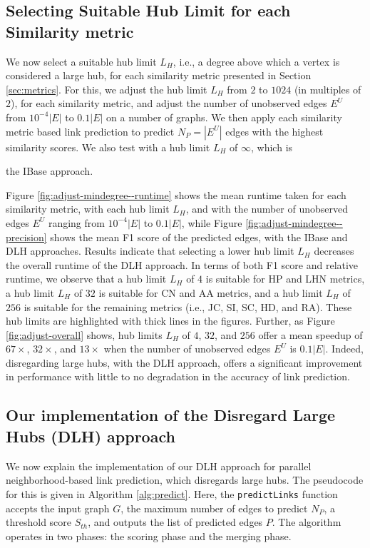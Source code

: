 \subsection{Selecting Suitable Hub Limit for each Similarity metric}
\label{sec:select-limit}

We now select a suitable hub limit $L_H$, i.e., a degree above which a vertex is considered a large hub, for each similarity metric presented in Section \ref{sec:metrics}. For this, we adjust the hub limit $L_H$ from $2$ to $1024$ (in multiples of $2$), for each similarity metric, and adjust the number of unobserved edges $E^U$ from $10^{-4}|E|$ to $0.1|E|$ on a number of graphs. We then apply each similarity metric based link prediction to predict $N_P = |E^U|$ edges with the highest similarity scores. We also test with a hub limit $L_H$ of $\infty$, which is the IBase approach.

Figure \ref{fig:adjust-mindegree--runtime} shows the mean runtime taken for each similarity metric, with each hub limit $L_H$, and with the number of unobserved edges $E^U$ ranging from $10^{-4}|E|$ to $0.1|E|$, while Figure \ref{fig:adjust-mindegree--precision} shows the mean F1 score of the predicted edges, with the IBase and DLH approaches. Results indicate that selecting a lower hub limit $L_H$ decreases the overall runtime of the DLH approach. In terms of both F1 score and relative runtime, we observe that a hub limit $L_H$ of $4$ is suitable for HP and LHN metrics, a hub limit $L_H$ of $32$ is suitable for CN and AA metrics, and a hub limit $L_H$ of $256$ is suitable for the remaining metrics (i.e., JC, SI, SC, HD, and RA). These hub limits are highlighted with thick lines in the figures. Further, as Figure \ref{fig:adjust-overall} shows, hub limits $L_H$ of $4$, $32$, and $256$ offer a mean speedup of $67\times$, $32\times$, and $13\times$ when the number of unobserved edges $E^U$ is $0.1|E|$. Indeed, disregarding large hubs, with the DLH approach, offers a significant improvement in performance with little to no degradation in the accuracy of link prediction.




\subsection{Our implementation of the Disregard Large Hubs (DLH) approach}

We now explain the implementation of our DLH approach for parallel neighborhood-based link prediction, which disregards large hubs. The pseudocode for this is given in Algorithm \ref{alg:predict}. Here, the \texttt{predictLinks} function accepts the input graph $G$, the maximum number of edges to predict $N_P$, a threshold score $S_{th}$, and outputs the list of predicted edges $P$. The algorithm operates in two phases: the scoring phase and the merging phase.

